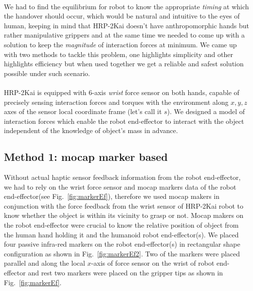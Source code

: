 \documentclass[a4paper, 12pt, oneside]{Thesis}  %
\begin{document}
\paragraph*{}
We had to find the equilibrium for robot to know the appropriate \textit{timing} at which the handover should occur, which would be natural and intuitive to the eyes of human, keeping in mind that HRP-2Kai doesn't have anthropomorphic hands but rather manipulative grippers and at the same time we needed to come up with a solution to keep the \textit{magnitude} of interaction forces at minimum. We came up with two methods to tackle this problem, one highlights simplicity and other highlights efficiency but when used together we get a reliable and safest solution possible under such scenario.

\paragraph*{}
HRP-2Kai is equipped with 6-axis \textit{wrist} force sensor on both hands, capable of precisely sensing interaction forces and torques with the environment along $x, y, z$ axes of the sensor local coordinate frame (let's call it $s$). We designed a model of interaction forces which enable the robot end-effector to interact with the object independent of the knowledge of object's mass in advance.

\subsection{Method 1: mocap marker based}
Without actual haptic sensor feedback information from the robot end-effector, we had to rely on the wrist force sensor and mocap markers data of the robot end-effector(see Fig.~\ref{fig:markerEf}), therefore we used mocap makers in conjunction with the force feedback from the wrist sensor of HRP-2Kai robot to know whether the object is within its vicinity to grasp or not. Mocap makers on the robot end-effector were crucial to know the relative position of object from the human hand holding it and the humanoid robot end-effector(s). We placed four passive infra-red markers on the robot end-effector(s) in rectangular shape configuration as shown in Fig.~\ref{fig:markerEf2}. Two of the markers were placed parallel and along the local $x$-axis of force sensor on the wrist of robot end-effector and rest two markers were placed on the gripper tips as shown in Fig.~\ref{fig:markerEf}.
\end{document}
